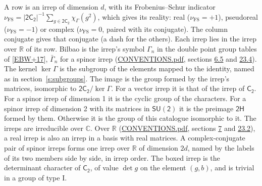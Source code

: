 \documentclass[10pt,a4paper]{article}
\numberwithin{equation}{section}
\newcommand{\grp}[1]{\mathsf{#1}}
\newcommand{\irchar}[1]{\chi_{#1}}
\newcommand{\fsind}{\nu_{\mathrm{FS}}}
\begin{document}
\leavevmode\label{n:index.frobenius}\label{n:head.irrep}\label{n:head.reality}A row is an irrep of dimension $d$, with its Frobenius--Schur indicator $\fsind = |\grp{2C_{2}}|^{-1}\allowbreak\sum_{g\in\grp{2C_{2}}}\irchar{\Gamma}(g^2)$, which gives its reality: real ($\fsind = +1$), pseudoreal ($\fsind = -1$) or complex ($\fsind = 0$, paired with its conjugate). \label{n:head.conjugate}The column conjugate gives that conjugate (a dash for the others). \label{n:head.over.real}Each irrep lies in the irrep over $\mathbb{R}$ of its row. \label{n:head.bilbao}\label{n:irrep.alias.gamma}Bilbao is the irrep's symbol $\Gamma_n$ in the double point group tables of [\href{../../../REFERENCES.pdf\#ref.EBW+17}{EBW+17}], $\bar{\Gamma}_n$ for a spinor irrep (\href{../../CONVENTIONS.pdf}{CONVENTIONS.pdf}, sections \href{../../../rotation/CONVENTIONS.pdf\#conv.6.5}{6.5} and \href{../../CONVENTIONS.pdf\#conv.23.4}{23.4}). \label{n:head.kernel}The kernel $\ker\Gamma$ is the subgroup of the elements mapped to the identity, named as in section~\ref{s:subgroups}. \label{n:head.image}The image is the group formed by the irrep's matrices, isomorphic to $\grp{2C_{2}}/\ker\Gamma$. For a vector irrep it is that of the irrep of \href{../../../rotation/data/pdf/C2.pdf}{$\grp{C_{2}}$}. For a spinor irrep of dimension 1 it is the cyclic group of the characters. For a spinor irrep of dimension 2 with its matrices in $\grp{SU(2)}$ it is the preimage $\grp{2H}$ formed by them. Otherwise it is the group of this catalogue isomorphic to it. The irreps are irreducible over $\mathbb{C}$. Over $\mathbb{R}$ (\href{../../CONVENTIONS.pdf}{CONVENTIONS.pdf}, sections \href{../../../rotation/CONVENTIONS.pdf\#conv.7}{7} and \href{../../CONVENTIONS.pdf\#conv.23.2}{23.2}), a real irrep is also an irrep in a basis with real matrices. A complex-conjugate pair of spinor irreps forms one irrep over $\mathbb{R}$ of dimension $2d$, named by the labels of its two members side by side, in irrep order. \label{n:mark.determinant}The boxed irrep is the determinant character of \href{../../../rotation/data/pdf/C2.pdf}{$\grp{C_{2}}$}, of value $\det g$ on the element $(g, b)$, and is trivial in a group of type I.
\setlength{\emergencystretch}{2em}\par\setlength{\emergencystretch}{0pt}
\end{document}

